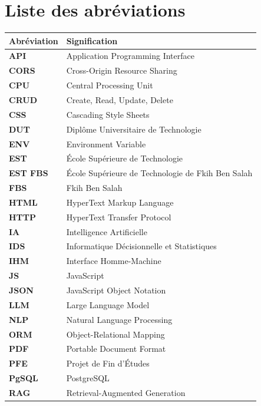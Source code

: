 \documentclass[12pt, a4paper, twoside]{report}
\begin{document}
\listoftables
{}
\cleardoublepage

\chapter*{Liste des abréviations}

\begin{longtable}{>{\bfseries}p{3.5cm} p{10cm}}
\toprule
\textbf{Abréviation} & \textbf{Signification} \\
\midrule
\endhead
\bottomrule
\endfoot
API    & Application Programming Interface \\
CORS   & Cross-Origin Resource Sharing \\
CPU    & Central Processing Unit \\
CRUD   & Create, Read, Update, Delete \\
CSS    & Cascading Style Sheets \\
DUT    & Diplôme Universitaire de Technologie \\
ENV    & Environment Variable \\
EST    & École Supérieure de Technologie \\
EST FBS& École Supérieure de Technologie de Fkih Ben Salah \\
FBS    & Fkih Ben Salah \\
HTML   & HyperText Markup Language \\
HTTP   & HyperText Transfer Protocol \\
IA     & Intelligence Artificielle \\
IDS    & Informatique Décisionnelle et Statistiques \\
IHM    & Interface Homme-Machine \\
JS     & JavaScript \\
JSON   & JavaScript Object Notation \\
LLM    & Large Language Model \\
NLP    & Natural Language Processing \\
ORM    & Object-Relational Mapping \\
PDF    & Portable Document Format \\
PFE    & Projet de Fin d'Études \\
PgSQL  & PostgreSQL \\
RAG    & Retrieval-Augmented Generation \\

\end{longtable}
\end{document}
